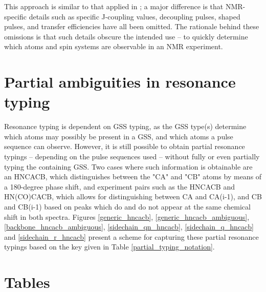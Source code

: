 This approach is similar to that applied in \cite{fox2004delineation}; a major
difference is that NMR-specific details such as specific J-coupling values, 
decoupling pulses, shaped pulses, and transfer efficiencies have all been 
omitted.  The rationale behind these omissions is that such details obscure
the intended use -- to quickly determine which atoms and spin systems are 
observable in an NMR experiment.


\section{Partial ambiguities in resonance typing}
Resonance typing is dependent on GSS typing, as the GSS type(s) determine
which atoms may possibly be present in a GSS, and which atoms a pulse 
sequence can observe.  However, it is still possible to obtain partial 
resonance typings -- depending on the pulse sequences used -- without fully
or even partially typing the containing GSS.  Two cases where such information
is obtainable are an HNCACB, which distinguishes between the "CA" and "CB"
atoms by means of a 180-degree phase shift, and experiment pairs such as the
HNCACB and HN(CO)CACB, which allows for distinguishing between CA and CA(i-1),
and CB and CB(i-1) based on peaks which do and do not appear at the same 
chemical shift in both spectra.
Figures 
\ref{generic_hncacb},
\ref{generic_hncacb_ambiguous},
\ref{backbone_hncacb_ambiguous},
\ref{sidechain_qn_hncacb},
\ref{sidechain_q_hncacb} and
\ref{sidechain_r_hncacb}
present a scheme for capturing these partial resonance typings based on the
key given in Table \ref{partial_typing_notation}.


\clearpage
\section{Tables}

